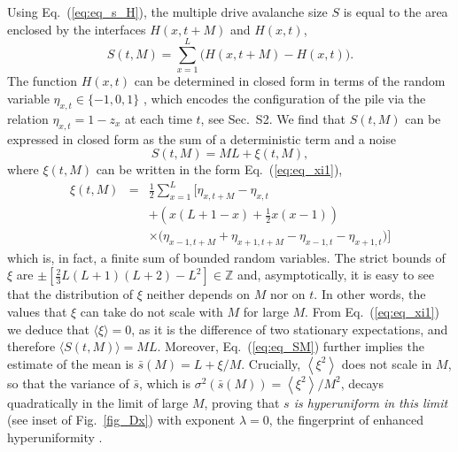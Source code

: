 \documentclass[doublecol]{epl2}
\newcommand{\etax}[1]{\eta_{x,#1}}
\newcommand{\ave}[1]{\left\langle{#1}\right\rangle}
\newcommand{\elabel}[1]{\label{eq:#1}}
\newcommand{\Eref}[1]{Eq.~(\ref{eq:#1})}
\newcommand{\Figref}[1]{Fig.~\ref{fig_#1}}
\newcommand{\bungledXR}[2]{#2}
\newcommand{\wasrevised}[1]{#1}
\begin{document}
Using \Eref{eq_s_H}, the multiple drive avalanche size $S$ is equal to the area enclosed by the interfaces $H(x,t+M)$ and $H(x,t)$,
 \begin{equation}
 S(t,M)  = \sum_{x=1}^L \big(H(x,t + {M}) - H(x,t)\big).
 \elabel{eq_def_S}
 \end{equation}
The function $H(x,t)$ can be determined in closed form in terms of the random variable $\etax{t}\in\{-1,0,1\}$ \cite{pruessner2003oslo}, which encodes the configuration of the pile via the relation $\etax{t}=1-z_x$ at each time $t$, see \bungledXR{\ref{sect_app_interface}}{Sec.~S2}.
We find that $S(t,M)$ can be expressed in closed form as the sum of a deterministic term and a noise
 \begin{equation}
  S(t,M) = ML + \xi(t,M),
   \elabel{eq_SM}
 \end{equation}
 where $\xi(t,M)$ can be written in the form \Eref{eq_xi1},
\begin{eqnarray}
\xi(t,M) &=& \frac{1}{2}\sum_{x=1}^{L}\bigg[\eta_{x,t+{M}} -\eta_{x,t} \\
&&+ \left(x(L+1-x)+\frac{1}{2}x(x-1)\right)\nonumber\\
&&\times\bigg(\eta_{x-1,t+{M}}+ \eta_{x+1,t+{M}} - \eta_{x-1,t}-\eta_{x+1,t}\bigg)\bigg]\nonumber
\elabel{eq_xi1}
\end{eqnarray}
which is, in fact, a finite sum of bounded random variables.  \wasrevised{The strict bounds of $\xi$ are $\pm\left[\frac{2}{3}L(L+1)(L+2)-L^2\right]\in\mathbb{Z}$ and, asymptotically, it is easy to see that the distribution of $\xi$ neither depends on $M$ nor on $t$.} %
In other words, the values that $\xi$ can take do not scale with $M$  \wasrevised{for large $M$}. From \Eref{eq_xi1} we deduce that  $\langle \xi\rangle =0$, as it is the difference of two stationary expectations, and therefore $\langle S(t,M)\rangle=ML$. \wasrevised{Moreover,} \Eref{eq_SM} further implies the estimate of the mean is $\bar{s}(M)=L+\xi/M$.  Crucially, $\ave{\xi^2}$ does not scale in $M$, so that the variance of $\bar{s}$, \wasrevised{which is} $\sigma^2\left(\bar{s}(M)\right)= \left\langle\xi^2\right\rangle/M^{2}$, decays quadratically in the limit of large $M$, proving that \emph{$s$ is hyperuniform in this limit} (see inset of \Figref{Dx}) with exponent $\lambda=0$,  the fingerprint of enhanced hyperuniformity \cite{hexner2017enhanced}.
\end{document}
